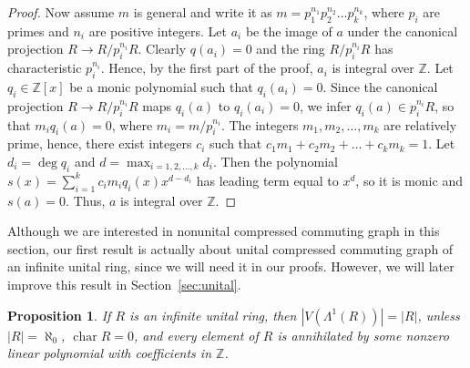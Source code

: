 \documentclass[12pt,a4paper]{amsart}
\newtheorem{proposition}{Proposition}
\theoremstyle{definition}
\newcommand{\Z}{\mathbb{Z}}
\DeclareMathOperator{\ch}{char}
\begin{document}
\begin{proof}
    Now assume $m$ is general and write it as $m=p_1^{n_1}p_2^{n_2}\ldots p_k^{n_k}$, where $p_i$ are primes and $n_i$ are positive integers.
    Let $a_i$ be the image of $a$ under the canonical projection $R \to R/p_i^{n_i}R$.
    Clearly $q(a_i)=0$ and the ring $R/p_i^{n_i}R$ has characteristic $p_i^{n_i}$.
    Hence, by the first part of the proof, $a_i$ is integral over $\Z$.
    Let $q_i \in \Z[x]$ be a monic polynomial such that $q_i(a_i)=0$.
    Since the canonical projection $R \to R/p_i^{n_i}R$ maps $q_i(a)$ to $q_i(a_i)=0$, we infer $q_i(a) \in p_i^{n_i}R$, so that $m_iq_i(a)=0$, where $m_i=m/p_i^{n_i}$.
    The integers $m_1,m_2,\ldots,m_k$ are relatively prime, hence, there exist integers $c_i$ such that $c_1m_1+c_2m_2+\ldots+c_km_k=1$.
    Let $d_i=\deg q_i$ and $d=\max_{i=1,2,\ldots,k} d_i$.
    Then the polynomial $s(x)=\sum_{i=1}^k c_i m_i q_i(x) x^{d-d_i}$ has leading term equal to $x^d$, so it is monic and $s(a)=0$. Thus, $a$ is integral over $\Z$.    
\end{proof}

Although we are interested in nonunital compressed commuting graph in this section, our first result is actually about unital compressed commuting graph of an infinite unital ring, since we will need it in our proofs. However, we will later improve this result in Section~\ref{sec:unital}.

\begin{proposition}\label{prop:inf_ring_1}
    If $R$ is an infinite unital ring, then $|V(\Lambda^1(R))|=|R|$, unless $|R|=\aleph_0$,  $\ch R = 0$, and every element of $R$ is annihilated by some nonzero linear polynomial with coefficients in $\Z$.
\end{proposition}
\end{document}

